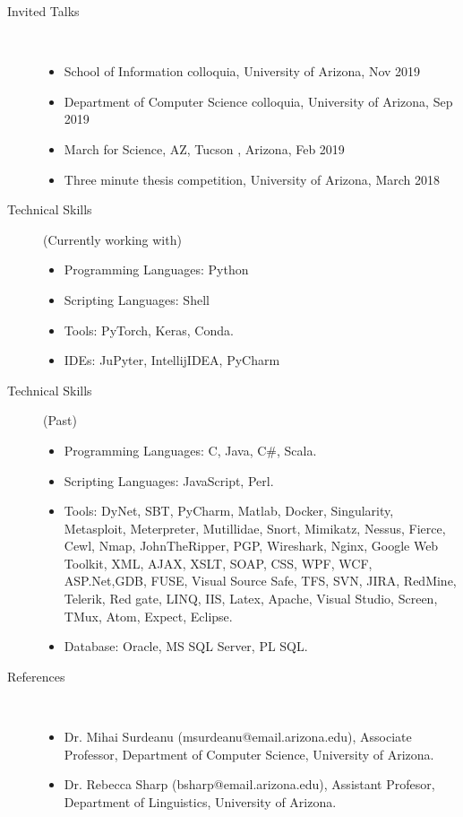 \documentclass[10pt]{article}
\begin{document}
\begin{description}
\begin{itemize}
\end{itemize}




\newpage


\item [Invited Talks ]\
\begin{itemize}
\item School of Information colloquia, University of Arizona, Nov 2019
\item Department of Computer Science colloquia, University of Arizona, Sep 2019
\item March for Science, AZ, Tucson , Arizona, Feb 2019
\item Three minute thesis competition, University of Arizona, March 2018
\end{itemize}



\item [Technical Skills](Currently working with) \
\begin{itemize}
\itemsep0em 
\item Programming Languages:  Python
\item Scripting Languages: Shell
\item Tools:  PyTorch, Keras, Conda.
\item IDEs: JuPyter,  IntellijIDEA, PyCharm 
\end{itemize}


\item [Technical Skills] (Past) \
\begin{itemize}
\itemsep0em 
\item Programming Languages:  C, Java, C\#, Scala. 
\item Scripting Languages: JavaScript, Perl.
\item Tools: DyNet, SBT, PyCharm, Matlab, Docker, Singularity, Metasploit, Meterpreter, Mutillidae, Snort, Mimikatz, Nessus, Fierce, Cewl, Nmap, JohnTheRipper, PGP, Wireshark, Nginx, Google Web Toolkit, XML, AJAX, XSLT, SOAP, CSS, WPF, WCF, ASP.Net,GDB, FUSE, Visual Source Safe, TFS, SVN, JIRA, RedMine, Telerik, Red gate, LINQ, IIS, Latex, Apache, Visual Studio, Screen, TMux, Atom, Expect, Eclipse.
\item Database: Oracle, MS SQL Server, PL SQL.\\
\end{itemize}
\item [References]  \
\begin{itemize}
\itemsep0em 
\item Dr. Mihai Surdeanu (msurdeanu@email.arizona.edu), Associate Professor, Department of Computer Science, University of Arizona.
\item Dr. Rebecca Sharp (bsharp@email.arizona.edu), Assistant Profesor, Department of Linguistics, University of Arizona.
\end{itemize}

\end{description}
\end{document}
